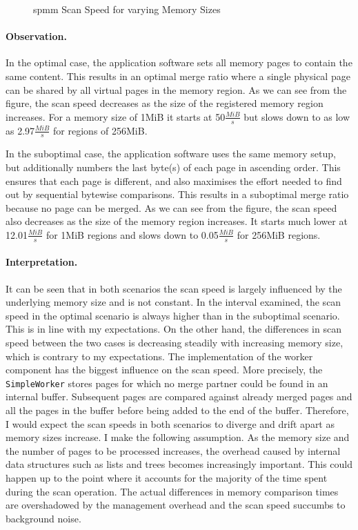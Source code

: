 \begin{figure}
  \centering
  
  \caption{\acs{spmm} Scan Speed for varying Memory Sizes}
  \label{fig:scan-speed}
\end{figure}

\paragraph{Observation.}

In the optimal case, the application software sets all memory pages to contain the same content.
This results in an optimal merge ratio where a single physical page can be shared by all virtual pages in the memory region.
As we can see from the figure, the scan speed decreases as the size of the registered memory region increases.
For a memory size of 1MiB it starts at 50$\frac{MiB}{s}$ but slows down to as low as 2.97$\frac{MiB}{s}$ for regions of 256MiB.

In the suboptimal case, the application software uses the same memory setup, but additionally numbers the last byte(s) of each page in ascending order.
This ensures that each page is different, and also maximises the effort needed to find out by sequential bytewise comparisons.
This results in a suboptimal merge ratio because no page can be merged.
As we can see from the figure, the scan speed also decreases as the size of the memory region increases.
It starts much lower at 12.01$\frac{MiB}{s}$ for 1MiB regions and slows down to 0.05$\frac{MiB}{s}$ for 256MiB regions.

\paragraph{Interpretation.}

It can be seen that in both scenarios the scan speed is largely influenced by the underlying memory size and is not constant.
In the interval examined, the scan speed in the optimal scenario is always higher than in the suboptimal scenario.
This is in line with my expectations.
On the other hand, the differences in scan speed between the two cases is decreasing steadily with increasing memory size, which is contrary to my expectations.
The implementation of the worker component has the biggest influence on the scan speed.
More precisely, the \texttt{Simple\-Worker} stores pages for which no merge partner could be found in an internal buffer.
Subsequent pages are compared against already merged pages and all the pages in the buffer before being added to the end of the buffer.
Therefore, I would expect the scan speeds in both scenarios to diverge and drift apart as memory sizes increase.
I make the following assumption.
As the memory size and the number of pages to be processed increases, the overhead caused by internal data structures such as lists and trees becomes increasingly important.
This could happen up to the point where it accounts for the majority of the time spent during the scan operation.
The actual differences in memory comparison times are overshadowed by the management overhead and the scan speed succumbs to background noise.


